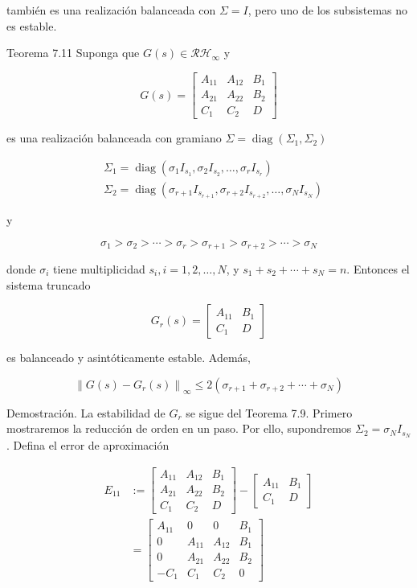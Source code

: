 también es una realización balanceada con $\Sigma=I$, pero uno de los subsistemas no es estable.

Teorema 7.11 Suponga que $G(s) \in \mathcal{R} \mathcal{H}_{\infty}$ y

$$
G(s)=\left[\begin{array}{cc|c}
A_{11} & A_{12} & B_{1} \\
A_{21} & A_{22} & B_{2} \\
\hline C_{1} & C_{2} & D
\end{array}\right]
$$

es una realización balanceada con gramiano $\Sigma=\operatorname{diag}\left(\Sigma_{1}, \Sigma_{2}\right)$

$$
\begin{aligned}
& \Sigma_{1}=\operatorname{diag}\left(\sigma_{1} I_{s_{1}}, \sigma_{2} I_{s_{2}}, \ldots, \sigma_{r} I_{s_{r}}\right) \\
& \Sigma_{2}=\operatorname{diag}\left(\sigma_{r+1} I_{s_{r+1}}, \sigma_{r+2} I_{s_{r+2}}, \ldots, \sigma_{N} I_{s_{N}}\right)
\end{aligned}
$$

y

$$
\sigma_{1}>\sigma_{2}>\cdots>\sigma_{r}>\sigma_{r+1}>\sigma_{r+2}>\cdots>\sigma_{N}
$$

donde $\sigma_{i}$ tiene multiplicidad $s_{i}, i=1,2, \ldots, N$, y $s_{1}+s_{2}+\cdots+s_{N}=n$. Entonces el sistema truncado

$$
G_{r}(s)=\left[\begin{array}{c|c}
A_{11} & B_{1} \\
\hline C_{1} & D
\end{array}\right]
$$

es balanceado y asintóticamente estable. Además,

$$
\left\|G(s)-G_{r}(s)\right\|_{\infty} \leq 2\left(\sigma_{r+1}+\sigma_{r+2}+\cdots+\sigma_{N}\right)
$$

Demostración. La estabilidad de $G_{r}$ se sigue del Teorema 7.9. Primero mostraremos la reducción de orden en un paso. Por ello, supondremos $\Sigma_{2}=\sigma_{N} I_{s_{N}}$. Defina el error de aproximación

$$
\begin{aligned}
E_{11} & :=\left[\begin{array}{cc|c}
A_{11} & A_{12} & B_{1} \\
A_{21} & A_{22} & B_{2} \\
\hline C_{1} & C_{2} & D
\end{array}\right]-\left[\begin{array}{cc|c}
A_{11} & B_{1} \\
\hline C_{1} & D
\end{array}\right] \\
& =\left[\begin{array}{ccc|c}
A_{11} & 0 & 0 & B_{1} \\
0 & A_{11} & A_{12} & B_{1} \\
0 & A_{21} & A_{22} & B_{2} \\
\hline-C_{1} & C_{1} & C_{2} & 0
\end{array}\right]
\end{aligned}
$$

